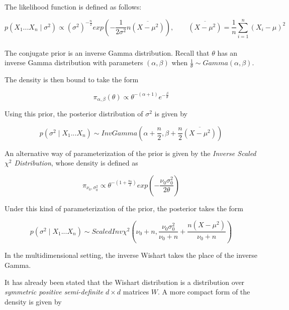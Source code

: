 \documentclass[12pt,openright,twoside,a4paper]{book}
\begin{document}
The likelihood function is defined as follows:

\begin{equation}
p(X_1...X_n\mid \sigma^2)\propto (\sigma^2)^{-\frac{n}{2}}exp(-\frac{1}{2\sigma^2}n \overline{(X-\mu^2)}) , \qquad \overline{(X-\mu^2)}=\frac{1}{n}\sum_{i=1}^n(X_i-\mu)^2
\label{gausslike}
\end{equation}
\\[12pt]

The conjugate prior is an inverse Gamma distribution. Recall that $\theta$ has an inverse Gamma distribution with parameters $(\alpha,\beta)$   when $\frac{1}{\theta}\sim Gamma(\alpha,\beta)$.

The density is then bound to take the form 

\begin{equation}
\pi_{\alpha,\beta}(\theta)\propto \theta^{-(\alpha+1)}e^{-\frac{\beta}{\theta}}
\end{equation}

Using this prior, the posterior distribution of $\sigma^2$ is given by

\begin{equation}
p( \sigma^2 \mid X_1...X_n)\sim InvGamma(\alpha + \frac{n}{2}, \beta + \frac{n}{2} \overline{(X-\mu^2)})
\end{equation}

An alternative way of parameterization of the prior is given by the \textit{Inverse Scaled $\chi^2$ Distribution}, whose density is defined as

\begin{equation}
\pi_{\nu_0, \sigma_0^2}\propto \theta^{-(1+ \frac{n_0}{2})}exp(-\frac{\nu_0 \sigma_0^2}{2\theta})
\end{equation}

Under this kind of parameterization of the prior, the posterior takes the form

\begin{equation}
p(\sigma^2 \mid X_1...X_n)\sim ScaledInv\chi^2(\nu_0+n, \frac{\nu_0 \sigma_0^2}{\nu_0 + n} + \frac{n(X-\mu^2)}{\nu_0 + n})
\end{equation}

In the multidimensional setting, the inverse Wishart takes the place of the inverse Gamma.

It has already been stated that the Wishart distribution is a distribution over \textit{symmetric positive semi-definite} $d\times d$ matrices $W$. A more compact form of the density is given by
\end{document}
